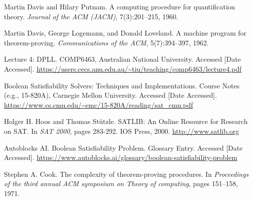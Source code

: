 \documentclass[12pt, a4paper]{article}
\begin{document}
\begin{thebibliography}{9}

Martin Davis and Hilary Putnam.
A computing procedure for quantification theory.
\emph{Journal of the ACM (JACM)}, 7(3):201–215, 1960.

Martin Davis, George Logemann, and Donald Loveland.
A machine program for theorem-proving.
\emph{Communications of the ACM}, 5(7):394–397, 1962.

Lecture 4: DPLL.
COMP6463, Australian National University.
Accessed [Date Accessed].
\url{https://users.cecs.anu.edu.au/~tiu/teaching/comp6463/lecture4.pdf}

Boolean Satisfiability Solvers: Techniques and Implementations.
Course Notes (e.g., 15-820A), Carnegie Mellon University.
Accessed [Date Accessed].
\url{https://www.cs.cmu.edu/~emc/15-820A/reading/sat_cmu.pdf}

Holger H. Hoos and Thomas Stützle.
SATLIB: An Online Resource for Research on SAT.
In \emph{SAT 2000}, pages 283-292. IOS Press, 2000.
\url{http://www.satlib.org} 

Autoblocks AI.
Boolean Satisfiability Problem.
Glossary Entry. Accessed [Date Accessed]. %
\url{https://www.autoblocks.ai/glossary/boolean-satisfiability-problem}

Stephen A. Cook.
The complexity of theorem-proving procedures.
In \emph{Proceedings of the third annual ACM symposium on Theory of computing}, pages 151–158, 1971.

\end{thebibliography}
\end{document}
